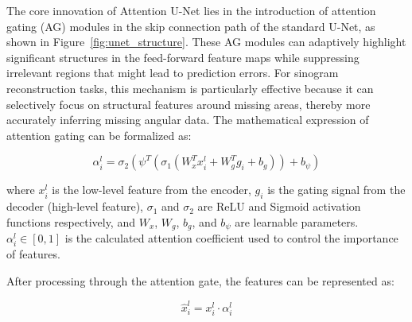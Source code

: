 \documentclass[
reprint,
superscriptaddress,
nofootinbib,
amsmath,amssymb,
aps,
prd,
]{revtex4-2}
\begin{document}
The core innovation of Attention U-Net lies in the introduction of attention gating (AG) modules in the skip connection path of the standard U-Net, as shown in Figure~\ref{fig:unet_structure}. These AG modules can adaptively highlight significant structures in the feed-forward feature maps while suppressing irrelevant regions that might lead to prediction errors. For sinogram reconstruction tasks, this mechanism is particularly effective because it can selectively focus on structural features around missing areas, thereby more accurately inferring missing angular data. The mathematical expression of attention gating can be formalized as:

\begin{equation}
\alpha_i^l = \sigma_2(\psi^T(\sigma_1(W_x^T x_i^l + W_g^T g_i + b_g)) + b_\psi)
\end{equation}

where $x_i^l$ is the low-level feature from the encoder, $g_i$ is the gating signal from the decoder (high-level feature), $\sigma_1$ and $\sigma_2$ are ReLU and Sigmoid activation functions respectively, and $W_x$, $W_g$, $b_g$, and $b_\psi$ are learnable parameters. $\alpha_i^l \in [0,1]$ is the calculated attention coefficient used to control the importance of features.

After processing through the attention gate, the features can be represented as:

\begin{equation}
\hat{x}_i^l = x_i^l \cdot \alpha_i^l
\end{equation}
\end{document}
